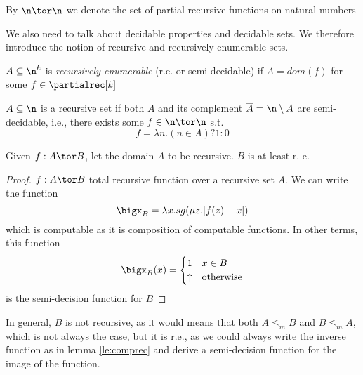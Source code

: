 \begin{notation}
  By \(\n \tor \n\) we denote the set of partial recursive functions
  on natural numbers
\end{notation}

We also need to talk about decidable properties and decidable sets. We
therefore introduce the notion of recursive and recursively enumerable
sets.

\begin{definition}
  \(A \subseteq \n^k\) is \emph{recursively enumerable} (r.e. or
  semi-decidable) if \(A = dom(f)\) for some \(f \in \partialrec[k]\)
\end{definition}

\begin{definition}
  \(A\subseteq \n\) is a recursive set if both \(A\) and its
  complement \(\overline{A} = \n \setminus A\) are semi-decidable,
  i.e., there exists some \(f \in \n \tor \n\) s.t. \[f = \lambda n
  . (n \in A) ? 1 : 0\]
\end{definition}

\begin{lemma}\label{le:comprec}
  Given \(f : A \tor B\), let the domain \(A\) to be recursive. \(B\)
  is at least r. e.
\end{lemma}

\begin{proof}
  \(f : A \tor B\) total recursive function over a recursive set
  \(A\). We can write the function
  \[\bigx_B = \lambda x . sg(\mu z . |f(z) - x|)\] which is computable
  as it is composition of computable functions. In other terms, this
  function
  \begin{equation*}
    \bigx_B(x) =
    \begin{cases}
      1 & x \in B \\
      \uparrow & \text{otherwise}
    \end{cases}
  \end{equation*}
  is the semi-decision function for \(B\)
\end{proof}

\begin{observation}\label{obs:comprec}
  In general, \(B\) is not recursive, as it would means that both \(A
  \leq_m B\) and \(B \leq_m A\), which is not always the case, but it
  is r.e., as we could always write the inverse function as in lemma
  \ref{le:comprec} and derive a semi-decision function for the image
  of the function.
\end{observation}
